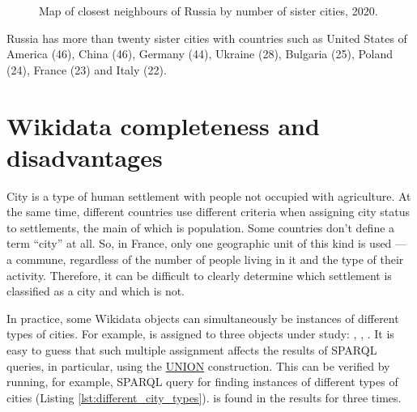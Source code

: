 
\begin{figure*}[h]
{
\setlength{\fboxsep}{0pt}%
\setlength{\fboxrule}{1pt}%
}
	\caption{Map of closest neighbours of Russia by number of sister cities, 2020.}
\end{figure*}

Russia has more than twenty sister cities with countries such as United States of America (46), China (46), Germany (44), Ukraine (28), Bulgaria (25), Poland (24), France (23) and Italy (22).

\section{Wikidata completeness and disadvantages}
\label{section:countries_Wikidata_completeness_and_disadvantages}

City is a type of human settlement with people not occupied with agriculture. At the same time, different countries use different criteria when assigning city status to settlements, the main of which is population. Some countries don't define a term ``city'' at all. So, in France, only one geographic unit of this kind is used — a commune, regardless of the number of people living in it and the type of their activity. Therefore, it can be difficult to clearly determine which settlement is classified as a city and which is not.

In practice, some Wikidata objects can simultaneously be instances of different types of cities. For example,  is assigned to three objects under study:  , , . It is easy to guess that such multiple assignment affects the results of SPARQL queries, in particular, using the \href{https://en.wikibooks.org/wiki/SPARQL/UNION}{UNION} construction. This can be verified by running, for example, SPARQL query for finding instances of different types of cities (Listing \ref{lst:different_city_types}).  is found in the results for three times.

